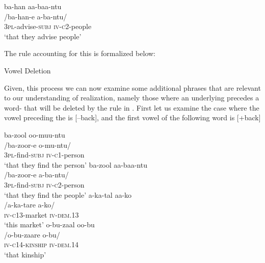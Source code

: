 \documentclass[output=paper,modfonts,nonflat,
colorlinks, citecolor=brown,
draftmode,
]{langsci/langscibook}
\begin{document}
\ex\label{ex:bickmore:16c}
\glll ba-han aa-baa-ntu\\
/ba-han-e a-ba-ntu/\\
\textsc{3pl-}\textup{advise}\textsc{-subj} \textsc{iv-c2-}\textup{people}\\
\glt      ‘that they advise people’
\z
\z

The rule accounting for this is formalized below:

\ea\label{ex:bickmore:17}
Vowel Deletion%
%

\phonrule{V}{ø}{{\longrule}]\textsubscript{w} \textsubscript{w}[ V  

      [--hi]}
\z
Given, this process we can now examine some additional phrases that are relevant to our understanding of  realization, namely those where an underlying  precedes a word- that will be deleted by the rule in . First let us examine the case where the vowel preceding the  is [--back], and the first vowel of the following word is [+back]

\ea\label{ex:bickmore:18}
\ea\label{ex:bickmore:18a}
\glll  ba-zool oo-muu-ntu    \\
      /ba-zoor-e o-mu-ntu/	\\
\textsc{3pl-}\textup{find}\textsc{-subj} \textsc{iv-c1-}\textup{person}\\
\glt      ‘that they find the person’
\ex\label{ex:bickmore:18b}
\glll  ba-zool aa-baa-ntu    \\
      /ba-zoor-e a-ba-ntu/	\\
\textsc{3pl-}\textup{find}\textsc{-subj} \textsc{iv-c2-}\textup{person}\\
\glt      ‘that they find the people’
\ex\label{ex:bickmore:18c}
\glll  a-ka-tal aa-ko    \\
      /a-ka-tare a-ko/	\\
\textsc{iv-c13-}\textup{market} \textsc{iv-dem.13}\\
\glt      ‘this market’
\ex\label{ex:bickmore:18d}
\glll  o-bu-zaal oo-bu    \\
      /o-bu-zaare o-bu/	\\
\textsc{iv-c14-kinship} \textsc{iv-dem.14}\\
\glt      ‘that kinship’
\z
\z
\end{document}
